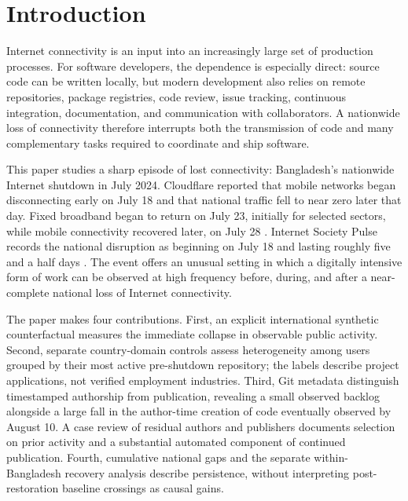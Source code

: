 \section{Introduction}
\label{sec:introduction}

Internet connectivity is an input into an increasingly large set of production processes. For software developers, the dependence is especially direct: source code can be written locally, but modern development also relies on remote repositories, package registries, code review, issue tracking, continuous integration, documentation, and communication with collaborators. A nationwide loss of connectivity therefore interrupts both the transmission of code and many complementary tasks required to coordinate and ship software.

This paper studies a sharp episode of lost connectivity: Bangladesh's nationwide Internet shutdown in July 2024. Cloudflare reported that mobile networks began disconnecting early on July 18 and that national traffic fell to near zero later that day. Fixed broadband began to return on July 23, initially for selected sectors, while mobile connectivity recovered later, on July 28 \citep{belson2024}. Internet Society Pulse records the national disruption as beginning on July 18 and lasting roughly five and a half days \citep{isoc2024}. The event offers an unusual setting in which a digitally intensive form of work can be observed at high frequency before, during, and after a near-complete national loss of Internet connectivity.

The paper makes four contributions. First, an explicit international synthetic counterfactual measures the immediate collapse in observable public activity. Second, separate country-domain controls assess heterogeneity among users grouped by their most active pre-shutdown repository; the labels describe project applications, not verified employment industries. Third, Git metadata distinguish timestamped authorship from publication, revealing a small observed backlog alongside a large fall in the author-time creation of code eventually observed by August 10. A case review of residual authors and publishers documents selection on prior activity and a substantial automated component of continued publication. Fourth, cumulative national gaps and the separate within-Bangladesh recovery analysis describe persistence, without interpreting post-restoration baseline crossings as causal gains.

